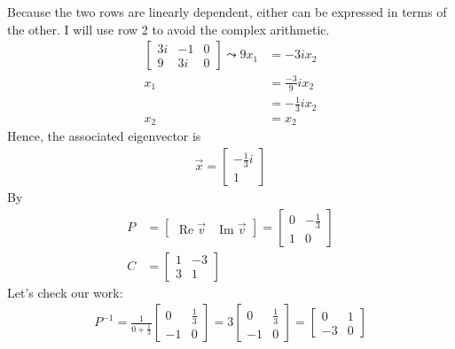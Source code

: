 \documentclass[10pt,letterpaper,final]{report}
\begin{document}
Because the two rows are linearly dependent, either can be expressed in terms of the other. I will use row 2 to avoid the complex arithmetic.
\begin{align*}
  \left[\begin{array}{rr|r}
      3i & -1 & 0 \\
      9  & 3i & 0
    \end{array}\right] \leadsto 9x_1 & = -3ix_2           \\[1ex]
  x_1                                & = \frac{-3}{9}ix_2 \\[1ex]
                                     & = -\frac{1}{3}ix_2 \\[1ex]
  x_2                                & = x_2
\end{align*}
Hence, the associated eigenvector is
\begin{align*}
  \vec{x} = \begin{bmatrix}
              -\frac{1}{3}i \\
              1
            \end{bmatrix}
\end{align*}
By \textcite[Theorem~5.9, p.~309]{LayEtAl2020LinearAlgebraAndItsApplications}
\begin{align*}
  P & = \begin{bmatrix}
          \operatorname{Re}\vec{v} & \operatorname{Im}\vec{v}
        \end{bmatrix} = \begin{bmatrix}
                          0 & -\frac{1}{3} \\
                          1 & 0
                        \end{bmatrix} \\[1ex]
  C & = \begin{bmatrix}
          1 & -3 \\
          3 & 1
        \end{bmatrix}
\end{align*}
Let's check our work:
\begin{align*}
  P^{-1} = \frac{1}{0 + \frac{1}{3}}\begin{bmatrix}
                                      0  & \frac{1}{3} \\
                                      -1 & 0
                                    \end{bmatrix} = 3\begin{bmatrix}
                                                       0  & \frac{1}{3} \\
                                                       -1 & 0
                                                     \end{bmatrix} = \begin{bmatrix}
                                                                       0  & 1 \\
                                                                       -3 & 0
                                                                     \end{bmatrix}
\end{align*}
\end{document}
